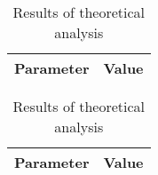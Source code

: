 \begin{table}[!htb]
  \begin{minipage}{.5\linewidth}
     \centering
  \begin{tabular}{|c|c|}
    \hline    
    {\bf Parameter} & {\bf Value} \\ \hline
    
 \end{tabular}
 \caption{Results of simulation analysis}
 \label{tab:merit}
  \end{minipage}%
    \hspace{2 mm}
    \begin{minipage}{.5\linewidth}
      \centering
        \begin{tabular}{|c|c|}
    \hline    
    {\bf Parameter} & {\bf Value} \\ \hline
    
 \end{tabular}
        \caption{Results of theoretical analysis}
        \label{compmerit}
    \end{minipage} 
\end{table}

